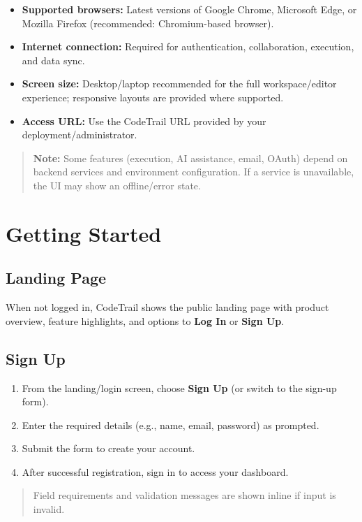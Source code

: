 \documentclass[11pt,a4paper]{article}
\begin{document}
\begin{itemize}
  \item \textbf{Supported browsers:} Latest versions of Google Chrome, Microsoft Edge, or Mozilla Firefox (recommended: Chromium-based browser).
  \item \textbf{Internet connection:} Required for authentication, collaboration, execution, and data sync.
  \item \textbf{Screen size:} Desktop/laptop recommended for the full workspace/editor experience; responsive layouts are provided where supported.
  \item \textbf{Access URL:} Use the CodeTrail URL provided by your deployment/administrator.
\end{itemize}

\begin{quote}
\textbf{Note:} Some features (execution, AI assistance, email, OAuth) depend on backend services and environment configuration. If a service is unavailable, the UI may show an offline/error state.
\end{quote}

\section{Getting Started}

\subsection{Landing Page}
When not logged in, CodeTrail shows the public landing page with product overview, feature highlights, and options to \textbf{Log In} or \textbf{Sign Up}.

\subsection{Sign Up}
\begin{enumerate}
  \item From the landing/login screen, choose \textbf{Sign Up} (or switch to the sign-up form).
  \item Enter the required details (e.g., name, email, password) as prompted.
  \item Submit the form to create your account.
  \item After successful registration, sign in to access your dashboard.
\end{enumerate}

\begin{quote}
Field requirements and validation messages are shown inline if input is invalid.
\end{quote}
\end{document}
